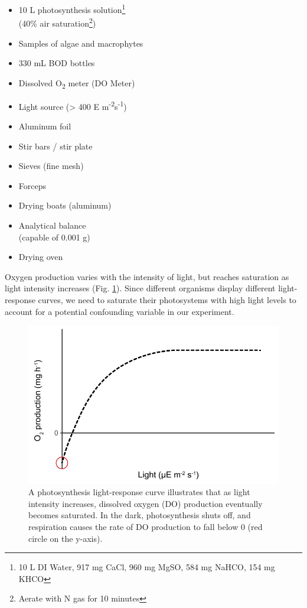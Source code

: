 \documentclass[]{book}
\begin{document}
\begin{multicols}{2}
\begin{itemize}{}
  \item 10 L photosynthesis solution\footnote{10 L DI Water, 917 mg CaCl, 960 mg MgSO, 584 mg NaHCO, 154 mg KHCO}\\(40\% air saturation\footnote{Aerate with N gas for 10 minutes})
  \item Samples of algae and macrophytes
  \item 330 mL BOD bottles
  \item Dissolved O\textsubscript{2} meter (DO Meter)
  \item Light source (> 400 \textmu E m\textsuperscript{-2}s\textsuperscript{-1})
  \item Aluminum foil
  \item Stir bars / stir plate
  \item Sieves (fine mesh)
  \item Forceps
  \item Drying boats (aluminum)
  \item Analytical balance \\(capable of 0.001 g)
  \item Drying oven
\end{itemize}
\end{multicols}

Oxygen production varies with the intensity of light, but reaches saturation as light intensity increases (Fig. \ref{fig:light-response-fig}). Since different organisms display different light-response curves, we need to saturate their photosystems with high light levels to account for a potential confounding variable in our experiment.

\begin{figure}
\centering
\includegraphics{chapter_materials/physiological_ecology/light_response_curve.pdf}
\caption{\label{fig:light-response-fig}A photosynthesis light-response curve illustrates that as light intensity increases, dissolved oxygen (DO) production eventually becomes saturated. In the dark, photosynthesis shuts off, and respiration causes the rate of DO production to fall below 0 (red circle on the y-axis).}
\end{figure}
\end{document}
